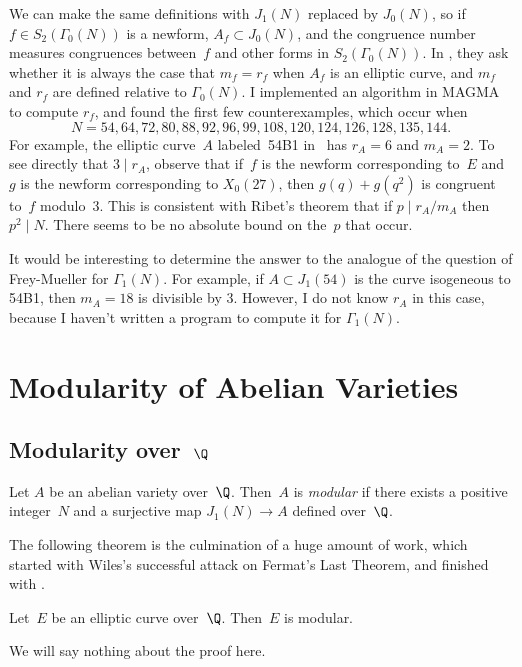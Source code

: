 \documentclass{report}
\begin{document}
We can make the same definitions with $J_1(N)$ replaced by $J_0(N)$,
so if $f\in S_2(\Gamma_0(N))$ is a newform, $A_f\subset J_0(N)$, and
the congruence number measures congruences between~$f$ and other
forms in $S_2(\Gamma_0(N))$.
In \cite[Ques.~4.4]{frey-muller}, they ask whether it is always the
case that $m_f = r_f$ when $A_f$ is an elliptic curve, and $m_f$
and $r_f$ are defined relative to $\Gamma_0(N)$.
I implemented an algorithm in MAGMA to compute $r_f$,
and found the first few counterexamples, which occur when
$$N = 54, 64, 72, 80, 88, 92, 96, 99, 108, 120, 124,
126, 128, 135, 144.$$
For example, the elliptic curve~$A$ labeled~54B1 in~\cite{cremona:algs}
has $r_A=6$
and $m_A=2$.  To see directly that $3 \mid r_A$, observe that if~$f$
is the newform corresponding to~$E$ and~$g$ is the newform
corresponding to $X_0(27)$, then $g(q) + g(q^2)$ is congruent to~$f$
modulo~$3$.  This is consistent with Ribet's theorem that if $p\mid
r_A/m_A$ then $p^2\mid N$. There seems to be no absolute bound on
the~$p$ that occur.

It would be interesting to determine the answer to the analogue of the
question of Frey-Mueller for $\Gamma_1(N)$.  For example, if $A\subset
J_1(54)$ is the curve isogeneous to 54B1, then $m_A = 18$ is divisible
by $3$.  However, I do not know $r_A$ in this case, because
I haven't written a program to compute it for $\Gamma_1(N)$.


\chapter{Modularity of Abelian Varieties}


\section{Modularity over~$\Q$}

\begin{definition}
  Let $A$ be an abelian variety over~$\Q$.  Then~$A$ is {\em modular}
  if there exists a positive integer~$N$ and a surjective map
  $J_1(N)\to A$ defined over~$\Q$.
\end{definition}

The following theorem is the culmination of a huge amount of work,
which started with Wiles's successful attack \cite{wiles:fermat} on
Fermat's Last Theorem, and finished with
\cite{breuil-conrad-diamond-taylor}.
\begin{theorem}\label{thm:modularity_theorem}
  Let~$E$ be an elliptic curve over~$\Q$.  Then~$E$ is modular.
\end{theorem}
We will say nothing about the proof here.
\end{document}
